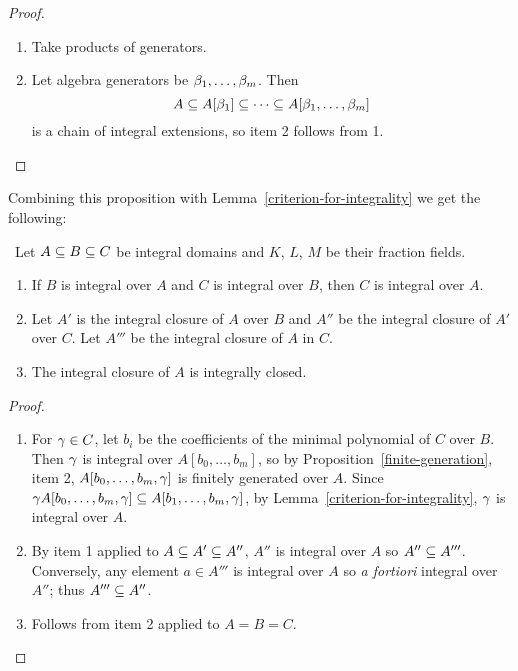 \begin{proof}$\,$
\vspace{0cm}
\begin{enumerate}
\item Take products of generators.
\item 
Let algebra generators be $\beta_1,\ldots, \beta_m$. Then
\[A\subseteq A[\beta_1]\subseteq \cdots \subseteq A[\beta_1,\ldots, \beta_m]\]
is a chain of integral extensions, so item 2 follows from 1.\qedhere
\end{enumerate}
\end{proof}
Combining this proposition with Lemma~\ref{criterion-for-integrality} we get the following:
\begin{pr}$\,$
\vspace{0cm}
Let $A\subseteq B\subseteq C$ be integral domains and $K$, $L$, $M$ be their fraction fields.
\begin{enumerate}
\item If $B$ is integral over $A$ and $C$ is integral over $B$, then $C$ is integral over $A$.
\item Let $A'$ is the integral closure of $A$ over $B$ and $A''$ be the integral closure of $A'$ over $C$. Let $A'''$ be the integral closure of $A$ in $C$. %
\item The integral closure of $A$ is integrally closed.
\end{enumerate}
\end{pr}
\begin{proof}$\,$
\vspace{0cm}
\begin{enumerate}
\item For $\gamma\in C$, let $b_i$ be the coefficients of the minimal polynomial of $C$ over $B$. Then $\gamma$ is integral over $A[b_0,\ldots, b_m]$, so by Proposition~\ref{finite-generation}, item 2, $A[b_0,\ldots, b_m,\gamma]$ is finitely generated over $A$. Since $\gamma A[b_0,\ldots, b_m,\gamma]\subseteq A[b_1,\ldots, b_m,\gamma]$, by Lemma~\ref{criterion-for-integrality}, $\gamma$ is integral over $A$.
\item By item 1 applied to $A\subseteq A'\subseteq A''$, $A''$ is integral over $A$ so $A''\subseteq A'''$. Conversely, any element $a\in A'''$ is integral over $A$ so {\it a fortiori} integral over $A''$; thus $A'''\subseteq A''$.
\item Follows from item 2 applied to $A=B=C$.\qedhere
\end{enumerate}
\end{proof}

